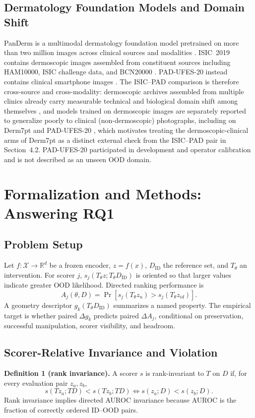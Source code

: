\documentclass[11pt,a4paper]{article}
\begin{document}
\subsection{Dermatology Foundation Models and Domain Shift}
PanDerm is a multimodal dermatology foundation model pretrained on more than two million images across clinical sources and modalities \cite{b12}. ISIC~2019 contains dermoscopic images assembled from constituent sources including HAM10000, ISIC challenge data, and BCN20000 \cite{b13,b14,b15}. PAD-UFES-20 instead contains clinical smartphone images \cite{b16}. The ISIC--PAD comparison is therefore cross-source and cross-modality: dermoscopic archives assembled from multiple clinics already carry measurable technical and biological domain shift among themselves \cite{b26}, and models trained on dermoscopic images are separately reported to generalize poorly to clinical (non-dermoscopic) photographs, including on Derm7pt and PAD-UFES-20 \cite{b27}, which motivates treating the dermoscopic-clinical arms of Derm7pt as a distinct external check from the ISIC--PAD pair in Section~4.2. PAD-UFES-20 participated in development and operator calibration and is not described as an unseen OOD domain.

\section{Formalization and Methods: Answering RQ1}
\subsection{Problem Setup}
Let $f:\mathcal{X}\rightarrow\mathbb{R}^{d}$ be a frozen encoder, $z=f(x)$, $D_{\mathrm{ID}}$ the reference set, and $T_\theta$ an intervention. For scorer $j$, $s_j(T_\theta z;T_\theta D_{\mathrm{ID}})$ is oriented so that larger values indicate greater OOD likelihood. Directed ranking performance is
\begin{equation}
A_j(\theta,D)=\Pr\!\left[s_j(T_\theta z_u)>s_j(T_\theta z_{id})\right].
\end{equation}
A geometry descriptor $g_k(T_\theta D_{\mathrm{ID}})$ summarizes a named property. The empirical target is whether paired $\Delta g_k$ predicts paired $\Delta A_j$, conditional on preservation, successful manipulation, scorer visibility, and headroom.

\subsection{Scorer-Relative Invariance and Violation}
\textbf{Definition 1 (rank invariance).} A scorer $s$ is rank-invariant to $T$ on $D$ if, for every evaluation pair $z_a,z_b$,
\begin{equation}
s(Tz_a;TD)<s(Tz_b;TD)\iff s(z_a;D)<s(z_b;D).
\end{equation}
Rank invariance implies directed AUROC invariance because AUROC is the fraction of correctly ordered ID--OOD pairs.
\end{document}
